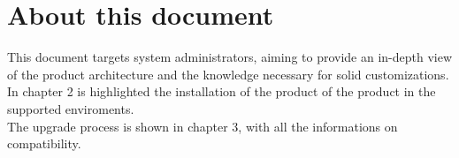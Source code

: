 \section{About this document}
    This document targets system administrators, aiming to provide an in-depth view of the product architecture
    and the knowledge necessary for solid customizations.\\
    In chapter 2 is highlighted the installation of the product of the product in the supported enviroments.\\
    The upgrade process is shown in chapter 3, with all the informations on compatibility.
